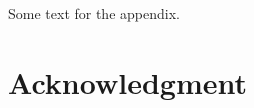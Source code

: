 \documentclass[journal]{IEEEtran}
\begin{document}

\appendices
\section{}
Some text for the appendix.

\section*{Acknowledgment}
\end{document}
